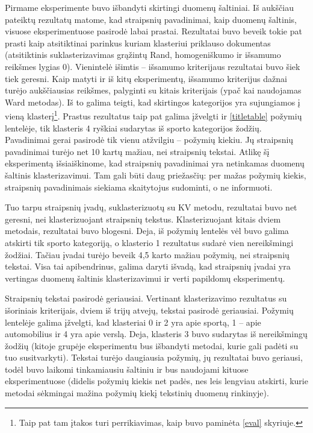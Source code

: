 \documentclass{VUMIFInfBakalaurinis}
\begin{document}
Pirmame eksperimente buvo išbandyti skirtingi duomenų šaltiniai. Iš
aukščiau pateiktų rezultatų matome, kad straipsnių pavadinimai, kaip
duomenų šaltinis, visuose eksperimentuose pasirodė labai prastai.
Rezultatai buvo beveik tokie pat prasti kaip atsitiktinai parinkus
kuriam klasteriui priklauso dokumentas (atsitiktinis suklasterizavimas
grąžintų Rand, homogeniškumo ir išsamumo reikšmes lygias 0). Vienintelė
išimtis -- išsamumo kriterijaus rezultatai buvo šiek tiek geresni. Kaip
matyti ir iš kitų eksperimentų, išsamumo kriterijus dažnai turėjo
aukščiausias reikšmes, palyginti su kitais kriterijais (ypač kai
naudojamas Ward metodas). Iš to galima teigti, kad skirtingos
kategorijos yra sujungiamos į vieną klasterį\footnote{Taip pat tam
  įtakos turi perrikiavimas, kaip buvo paminėta \ref{eval} skyriuje.}.
Prastus rezultatus taip pat galima įžvelgti ir \ref{titletable} požymių lentelėje, tik klasteris 4 ryškiai sudarytas iš sporto kategorijos
žodžių. Pavadinimai gerai pasirodė tik vienu atžvilgiu -- požymių
kiekiu. Jų straipsnių pavadinimai turėjo net 10 kartų mažiau, nei
straipsnių tekstai. Atlikę šį eksperimentą išsiaiškinome, kad straipsnių
pavadinimai yra netinkamas duomenų šaltinis klasterizavimui. Tam gali
būti daug priežasčių: per mažas požymių kiekis, straipsnių pavadinimais
siekiama skaitytojus sudominti, o ne informuoti.

Tuo tarpu straipsnių įvadų, suklasterizuotų su KV metodu, rezultatai
buvo net geresni, nei klasterizuojant straipsnių tekstus.
Klasterizuojant kitais dviem metodais, rezultatai buvo blogesni. Deja,
iš požymių lentelės vėl buvo galima atskirti tik sporto kategoriją, o
klasterio 1 rezultatus sudarė vien nereikšmingi žodžiai. Tačiau
įvadai turėjo beveik 4,5 karto mažiau požymių, nei straipsnių tekstai.
Visa tai apibendrinus, galima daryti išvadą, kad straipsnių įvadai yra
vertingas duomenų šaltinis klasterizavimui ir verti papildomų
eksperimentų.

Straipsnių tekstai pasirodė geriausiai. Vertinant klasterizavimo
rezultatus su išoriniais kriterijais, dviem iš trijų atvejų, tekstai
pasirodė geriausiai. Požymių lentelėje galima įžvelgti, kad klasteriai
 0 ir 2 yra apie sportą, 1 -- apie automobilius ir 4 yra apie
verslą. Deja, klasteris 3 buvo sudarytas iš nereikšmingų žodžių
(kitoje grupėje eksperimentu bus išbandyti metodai, kurie gali padėti su
tuo susitvarkyti). Tekstai turėjo daugiausia požymių, jų rezultatai buvo
geriausi, todėl buvo laikomi tinkamiausiu šaltiniu ir bus naudojami
kituose eksperimentuose (didelis požymių kiekis net padės, nes leis
lengviau atskirti, kurie metodai sėkmingai mažina požymių kiekį
tekstinių duomenų rinkinyje).
\end{document}
